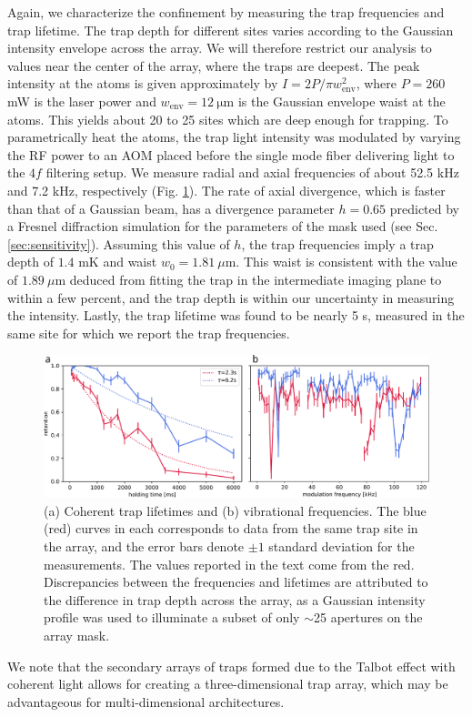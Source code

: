 Again, we characterize the confinement by measuring the trap frequencies and trap lifetime. The trap depth for different sites varies according to the Gaussian intensity envelope across the array. We will therefore restrict our analysis to values near the center of the array, where the traps are deepest. The peak intensity at the atoms is given approximately by $I = 2P/\pi w_{\text{env}}^2$, where $P=260$ mW is the laser power and $w_{\text {env}}=12~\mathrm{ \mu m}$ is the Gaussian envelope waist at the atoms. This yields about 20 to 25 sites which are deep enough for trapping. To parametrically heat the atoms, the trap light intensity was modulated by varying the RF power to an AOM placed before the single mode fiber delivering light to the $4f$ filtering setup. We measure radial and axial frequencies of about 52.5 kHz and 7.2 kHz, respectively (Fig. \ref{fig:coherent_frequencies_and_lifetime}). The rate of axial divergence, which is faster than that of a Gaussian beam, has a divergence parameter $h=0.65$ predicted by a Fresnel diffraction simulation for the parameters of the mask used (see Sec. \ref{sec:sensitivity}). Assuming this value of $h$, the trap frequencies imply a trap depth of $1.4$ mK and waist $w_0=1.81~\mu$m. This waist is consistent with the value of $1.89~\mu$m deduced from fitting the trap in the intermediate imaging plane to within a few percent, and the trap depth is within our uncertainty in measuring the intensity. Lastly, the trap lifetime was found to be nearly 5 s, measured in the same site for which we report the trap frequencies.

\begin{figure}[h]
    \centering
    \includegraphics[width=\textwidth]{Images/coherent_trap_lifetime_and_resonances.pdf}
    \caption{(a) Coherent trap lifetimes and (b) vibrational frequencies. The blue (red) curves in each corresponds to data from the same trap site in the array, and the error bars denote $\pm1$ standard deviation for the measurements. The values reported in the text come from the red. Discrepancies between the frequencies and lifetimes are attributed to the difference in trap depth across the array, as a Gaussian intensity profile was used to illuminate a subset of only $\sim$25 apertures on the array mask.}
    \label{fig:coherent_frequencies_and_lifetime}
\end{figure}
We note that the secondary arrays of traps formed due to the Talbot effect with coherent light allows for creating a three-dimensional trap array, which may be advantageous for multi-dimensional architectures\cite{YWang2016,Barredo2018}.

